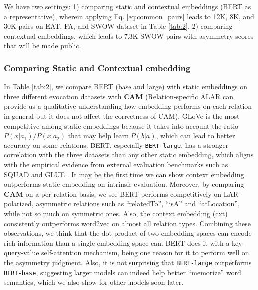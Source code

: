 \documentclass[letterpaper]{article} %
\begin{document}
We have two settings: 1) comparing static and contextual embeddings (BERT as a representative), wherein applying Eq. \ref{eq:common_pairs} leads to 12K, 8K, and 30K pairs on EAT, FA, and SWOW dataset in Table \ref{tab:2}.
 2) comparing contextual embeddings, which leads to 7.3K SWOW pairs with asymmetry scores that will be made public.


\subsubsection{Comparing Static and Contextual embedding} In Table \ref{tab:2}, we compare BERT (base and large) with static embeddings on three different evocation datasets with \textbf{CAM} (Relation-specific ALAR can provide us a qualitative understanding how embedding performs on each relation in general but it does not affect the correctness of CAM). GLoVe is the most competitive among static embeddings because it takes into account the ratio $P(x|a_1)/P(x|a_2)$ that may help learn $P(b|a)$, which can lead to better accuracy on some relations. BERT, especially \texttt{BERT-large}, has a stronger correlation with the three datasets than any other static embedding, which aligns with the empirical evidence from external evaluation benchmarks such as SQUAD \cite{rajpurkar-etal-2016-squad} and GLUE \cite{wang2018glue}. It may be the first time we can show context embedding outperforms static embedding on intrinsic evaluation. Moreover, by comparing \textbf{CAM} on a per-relation basis, we see BERT performs competitively on LAR-polarized, asymmetric relations such as ``relatedTo'', ``isA'' and ``atLocation'', while not so much on symmetric ones. Also, the context embedding (cxt) consistently outperforms word2vec on almost all relation types. Combining these observations, we think that the dot-product of two embedding spaces can encode rich information than a single embedding space can. BERT does it with a key-query-value self-attention mechanism, being one reason for it to perform well on the asymmetry judgment. Also, it is not surprising that \texttt{BERT-large} outperforms \texttt{BERT-base}, suggesting larger models can indeed help better ``memorize'' word semantics, which we also show for other models soon later.
\end{document}
